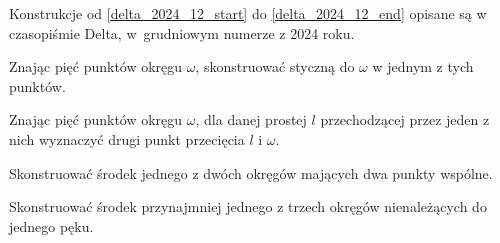 %

Konstrukcje od \ref{delta_2024_12_start} do \ref{delta_2024_12_end} opisane są w czasopiśmie Delta, w~grudniowym numerze z 2024 roku.

\begin{geoconstruction}
    \label{delta_2024_12_start}
    Znając pięć punktów okręgu $\omega$, skonstruować styczną do $\omega$ w jednym z tych punktów.
\end{geoconstruction}

\begin{geoconstruction}
    Znając pięć punktów okręgu $\omega$, dla danej prostej $l$ przechodzącej przez jeden z nich wyznaczyć drugi punkt przecięcia $l$ i $\omega$.
\end{geoconstruction}

\begin{geoconstruction}
    Skonstruować środek jednego z dwóch okręgów mających dwa punkty wspólne.
\end{geoconstruction}

\begin{geoconstruction}
    \label{delta_2024_12_end}
    Skonstruować środek przynajmniej jednego z trzech okręgów nienależących do jednego pęku.
\end{geoconstruction}

%